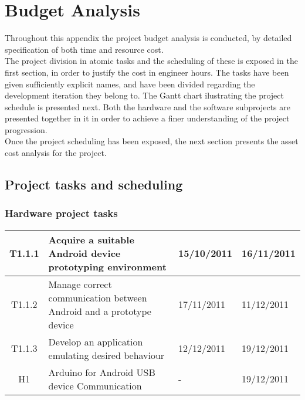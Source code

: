 \chapter{Budget Analysis}
\label{ch:budget}

\newcommand*\cleartoleftpage{%
  \clearpage
  \ifodd\value{page}\hbox{}\newpage\fi
}

	Throughout this appendix the project budget analysis is conducted, by detailed specification of both time and resource cost.\\

	The project division in atomic tasks and the scheduling of these is exposed in the first section, in order to justify the cost in engineer hours. The tasks have been given sufficiently explicit names, and have been divided regarding the development iteration they belong to. The Gantt chart ilustrating the project schedule is presented next. Both the hardware and the software subprojects are presented together in it in order to achieve a finer understanding of the project progression.\\

	Once the project scheduling has been exposed, the next section presents the asset cost analysis for the project.\\
	
	\section{Project tasks and scheduling}
	\label{sec:sched}

		\subsection{Hardware project tasks}
		\begin{tabular}{| c | p{6cm} | l | l |} %
		\hline
			T1.1.1 & Acquire a suitable Android device prototyping environment & 15/10/2011 & 16/11/2011\\ \hline
			T1.1.2 & Manage correct communication between Android and a prototype 		device & 17/11/2011 & 11/12/2011\\ \hline
			T1.1.3 & Develop an application emulating desired behaviour & 12/12/2011 & 19/12/2011\\ \hline
H1 & Arduino for Android USB device Communication & - & 19/12/2011\\ \hline
		\end{tabular}\\\\

